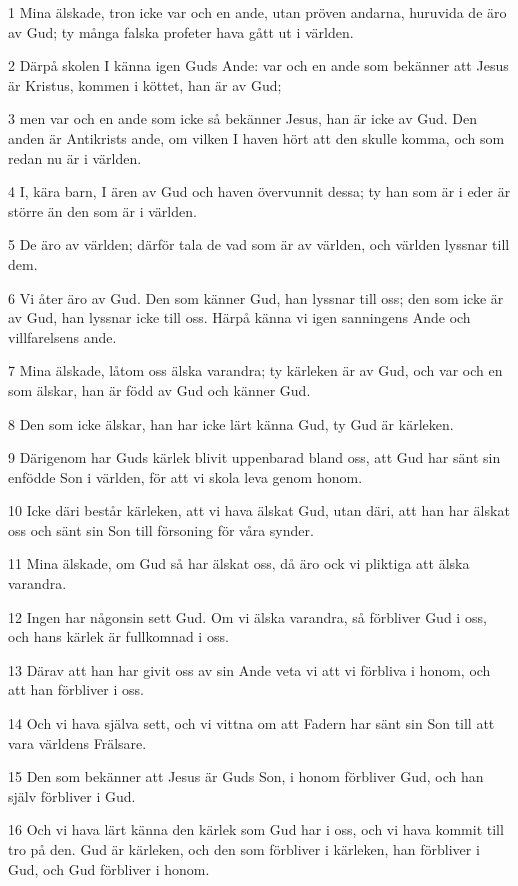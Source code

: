 \par 1 Mina älskade, tron icke var och en ande, utan pröven andarna, huruvida de äro av Gud; ty många falska profeter hava gått ut i världen.
\par 2 Därpå skolen I känna igen Guds Ande: var och en ande som bekänner att Jesus är Kristus, kommen i köttet, han är av Gud;
\par 3 men var och en ande som icke så bekänner Jesus, han är icke av Gud. Den anden är Antikrists ande, om vilken I haven hört att den skulle komma, och som redan nu är i världen.
\par 4 I, kära barn, I ären av Gud och haven övervunnit dessa; ty han som är i eder är större än den som är i världen.
\par 5 De äro av världen; därför tala de vad som är av världen, och världen lyssnar till dem.
\par 6 Vi åter äro av Gud. Den som känner Gud, han lyssnar till oss; den som icke är av Gud, han lyssnar icke till oss. Härpå känna vi igen sanningens Ande och villfarelsens ande.
\par 7 Mina älskade, låtom oss älska varandra; ty kärleken är av Gud, och var och en som älskar, han är född av Gud och känner Gud.
\par 8 Den som icke älskar, han har icke lärt känna Gud, ty Gud är kärleken.
\par 9 Därigenom har Guds kärlek blivit uppenbarad bland oss, att Gud har sänt sin enfödde Son i världen, för att vi skola leva genom honom.
\par 10 Icke däri består kärleken, att vi hava älskat Gud, utan däri, att han har älskat oss och sänt sin Son till försoning för våra synder.
\par 11 Mina älskade, om Gud så har älskat oss, då äro ock vi pliktiga att älska varandra.
\par 12 Ingen har någonsin sett Gud. Om vi älska varandra, så förbliver Gud i oss, och hans kärlek är fullkomnad i oss.
\par 13 Därav att han har givit oss av sin Ande veta vi att vi förbliva i honom, och att han förbliver i oss.
\par 14 Och vi hava själva sett, och vi vittna om att Fadern har sänt sin Son till att vara världens Frälsare.
\par 15 Den som bekänner att Jesus är Guds Son, i honom förbliver Gud, och han själv förbliver i Gud.
\par 16 Och vi hava lärt känna den kärlek som Gud har i oss, och vi hava kommit till tro på den. Gud är kärleken, och den som förbliver i kärleken, han förbliver i Gud, och Gud förbliver i honom.

